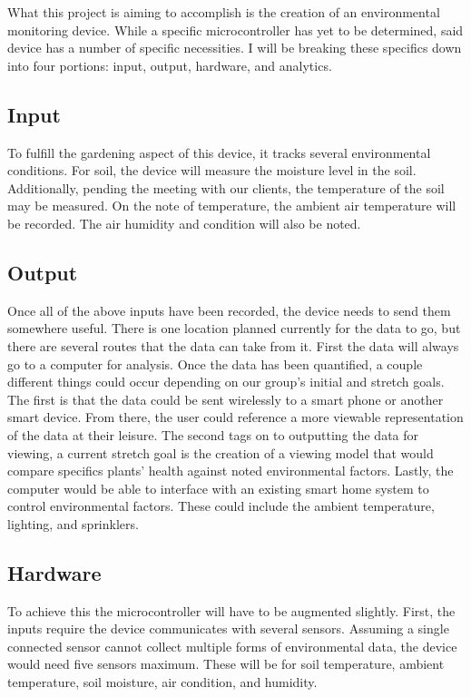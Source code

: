 \documentclass[IEEEtran,letterpaper,10pt,titlepage,fleqn,draftclsnofoot,onecolumn]{article}
\begin{document}
What this project is aiming to accomplish is the creation of an environmental monitoring device. While a specific microcontroller has yet to be determined, said device has a number of specific necessities. I will be breaking these specifics down into four portions: input, output, hardware, and analytics. 

\subsection{Input}

To fulfill the gardening aspect of this device, it tracks several environmental conditions. For soil, the device will measure the moisture level in the soil. Additionally, pending the meeting with our clients, the temperature of the soil may be measured. On the note of temperature, the ambient air temperature will be recorded. The air humidity and condition will also be noted.

\subsection{Output}

Once all of the above inputs have been recorded, the device needs to send them somewhere useful. There is one location planned currently for the data to go, but there are several routes that the data can take from it. First the data will always go to a computer for analysis. Once the data has been quantified, a couple different things could occur depending on our group’s initial and stretch goals. The first is that the data could be sent wirelessly to a smart phone or another smart device. From there, the user could reference a more viewable representation of the data at their leisure. The second tags on to outputting the data for viewing, a current stretch goal is the creation of a viewing model that would compare specifics plants’ health against noted environmental factors. Lastly, the computer would be able to interface with an existing smart home system to control environmental factors. These could include the ambient temperature, lighting, and sprinklers.

\subsection{Hardware}

To achieve this the microcontroller will have to be augmented slightly. First, the inputs require the device communicates with several sensors. Assuming a single connected sensor cannot collect multiple forms of environmental data, the device would need five sensors maximum. These will be for soil temperature, ambient temperature, soil moisture, air condition, and humidity.
\end{document}
